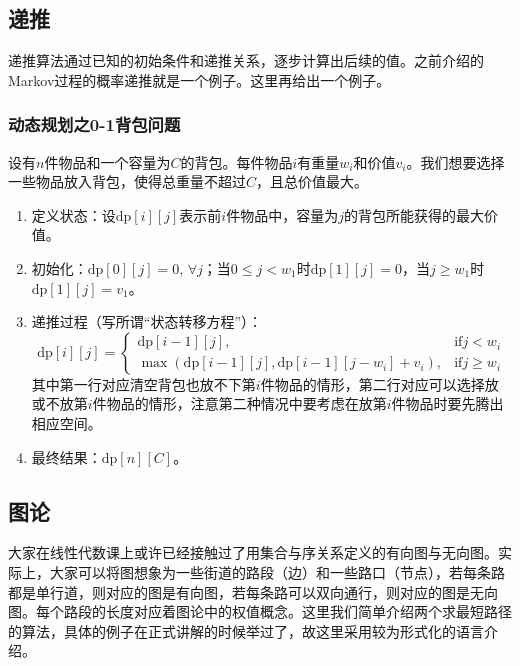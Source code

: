 \documentclass[a4paper, 12pt]{article}
\begin{document}
    \subsection{递推}

    递推算法通过已知的初始条件和递推关系，逐步计算出后续的值。之前介绍的Markov过程的概率递推就是一个例子。这里再给出一个例子。

    \subsubsection{动态规划之0-1背包问题}

    设有$n$件物品和一个容量为$C$的背包。每件物品$i$有重量$w_i$和价值$v_i$。我们想要选择一些物品放入背包，使得总重量不超过$C$，且总价值最大。

    \begin{enumerate}
        \item 定义状态：设$\mathrm{dp}[i][j]$表示前$i$件物品中，容量为$j$的背包所能获得的最大价值。
        \item 初始化：$\mathrm{dp}[0][j]=0,\,\forall j$；当$0\leq j < w_1$时$\mathrm{dp}[1][j]=0$，当$j \geq w_1$时$\mathrm{dp}[1][j]=v_1$。
        \item 递推过程（写所谓“状态转移方程”）：
        \[
        \mathrm{dp}[i][j] = \begin{cases}
            \mathrm{dp}[i-1][j], & \text{if} j < w_i \\
            \max(\mathrm{dp}[i-1][j], \mathrm{dp}[i-1][j-w_i] + v_i), & \text{if} j \geq w_i
        \end{cases}
        \]
        其中第一行对应清空背包也放不下第$i$件物品的情形，第二行对应可以选择放或不放第$i$件物品的情形，注意第二种情况中要考虑在放第$i$件物品时要先腾出相应空间。
        \item 最终结果：$\mathrm{dp}[n][C]$。
    \end{enumerate}

    \subsection{图论}

    大家在线性代数课上或许已经接触过了用集合与序关系定义的有向图与无向图。实际上，大家可以将图想象为一些街道的路段（边）和一些路口（节点），若每条路都是单行道，则对应的图是有向图，若每条路可以双向通行，则对应的图是无向图。每个路段的长度对应着图论中的权值概念。这里我们简单介绍两个求最短路径的算法，具体的例子在正式讲解的时候举过了，故这里采用较为形式化的语言介绍。
\end{document}
